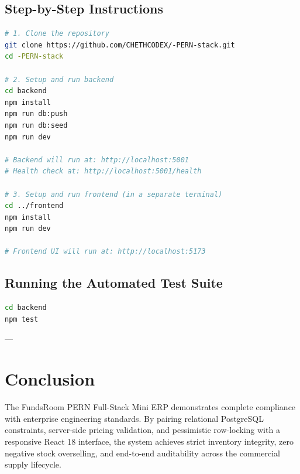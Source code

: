 \documentclass[11pt,a4paper]{article}
\begin{document}
\subsection{Step-by-Step Instructions}
\begin{lstlisting}[language=bash, caption={Local Startup Instructions}]
# 1. Clone the repository
git clone https://github.com/CHETHCODEX/-PERN-stack.git
cd -PERN-stack

# 2. Setup and run backend
cd backend
npm install
npm run db:push
npm run db:seed
npm run dev

# Backend will run at: http://localhost:5001
# Health check at: http://localhost:5001/health

# 3. Setup and run frontend (in a separate terminal)
cd ../frontend
npm install
npm run dev

# Frontend UI will run at: http://localhost:5173
\end{lstlisting}

\subsection{Running the Automated Test Suite}
\begin{lstlisting}[language=bash, caption={Running Vitest Test Suite}]
cd backend
npm test
\end{lstlisting}

---

\section{Conclusion}

The FundsRoom PERN Full-Stack Mini ERP demonstrates complete compliance with enterprise engineering standards. By pairing relational PostgreSQL constraints, server-side pricing validation, and pessimistic row-locking with a responsive React 18 interface, the system achieves strict inventory integrity, zero negative stock overselling, and end-to-end auditability across the commercial supply lifecycle.
\end{document}
